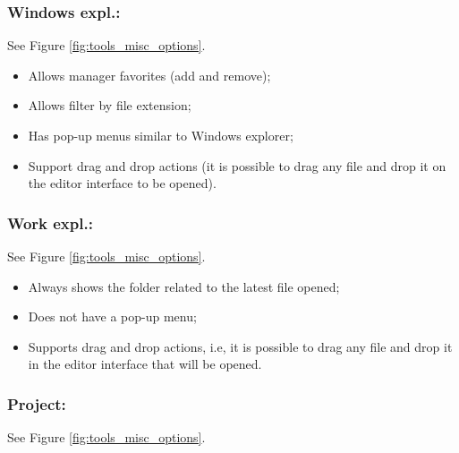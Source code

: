 \hypertarget{working_tools_misc_windowsexpl}{}
\subsubsection{Windows expl.:}
See Figure \ref{fig:tools_misc_options}.

\begin{itemize}
  \item Allows manager favorites (add and remove);
  \item Allows filter by file extension;
  \item Has pop-up menus similar to Windows explorer;
  \item Support drag and drop actions (it is possible to drag
    any file and drop it on the editor interface to be opened).
\end{itemize}


\hypertarget{working_tools_misc_workexpl}{}
\subsubsection{Work expl.:}
See Figure \ref{fig:tools_misc_options}.

\begin{itemize}
  \item Always shows the folder related to the latest file opened;
  \item Does not have a pop-up menu;
  \item Supports drag and drop actions, i.e, it is possible to drag any
    file and drop it in the editor interface that will be opened.
\end{itemize}


\hypertarget{working_tools_misc_project}{}
\subsubsection{Project:}

See Figure \ref{fig:tools_misc_options}.

